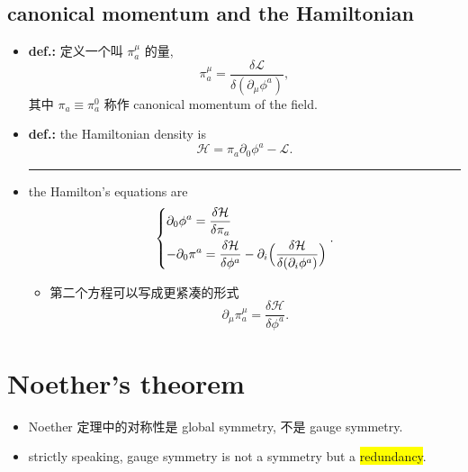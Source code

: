 \subsection{canonical momentum and the Hamiltonian}
\begin{itemize}
	\item \textbf{def.:} 定义一个叫 $\pi_a^\mu$ 的量,
	\begin{equation}
		\pi_a^\mu = \frac{\delta \mathcal{L}}{\delta (\partial_\mu \phi^a)},
	\end{equation}
	其中 $\pi_a \equiv \pi_a^0$ 称作 canonical momentum of the field.
	
	\item \textbf{def.:} the Hamiltonian density is
	\begin{equation}
		\mathcal{H} = \pi_a \partial_0 \phi^a - \mathcal{L}.
	\end{equation}
	
	\noindent\rule[0.5ex]{\linewidth}{0.5pt} %
	
	\item the Hamilton's equations are
	\begin{equation}
		\begin{dcases}
			\partial_0 \phi^a = \frac{\delta \mathcal{H}}{\delta \pi_a} \\
			- \partial_0 \pi^a = \frac{\delta \mathcal{H}}{\delta \phi^a} - \partial_i \Big( \frac{\delta \mathcal{H}}{\delta (\partial_i \phi^a)} \Big)
		\end{dcases}.
	\end{equation}
	\begin{itemize}
		\item 第二个方程可以写成更紧凑的形式
		\begin{equation}
			\partial_\mu \pi_a^\mu = \frac{\delta \mathcal{H}}{\delta \phi^a}.
		\end{equation}
	\end{itemize}
\end{itemize}

\section{Noether's theorem} \label{classical field theory and Noether's theorem.2}
\begin{itemize}
	\item Noether 定理中的对称性是 global symmetry, 不是 gauge symmetry.
	
	\item strictly speaking, gauge symmetry is not a symmetry but a \colorbox{yellow}{redundancy}.
\end{itemize}

